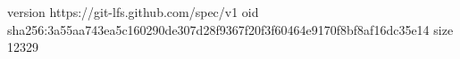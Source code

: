 version https://git-lfs.github.com/spec/v1
oid sha256:3a55aa743ea5c160290de307d28f9367f20f3f60464e9170f8bf8af16dc35e14
size 12329
